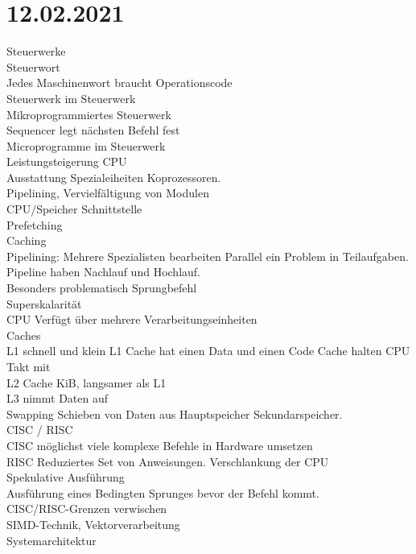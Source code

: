 \documentclass{article}
\begin{document}
	\section*{12.02.2021}
	Steuerwerke \\
	Steuerwort \\
	Jedes Maschinenwort braucht Operationscode \\
	Steuerwerk im Steuerwerk \\
	Mikroprogrammiertes Steuerwerk \\
	Sequencer legt nächsten Befehl fest \\
	Microprogramme im Steuerwerk \\
	Leistungsteigerung CPU \\
	Ausstattung Spezialeiheiten Koprozessoren. \\
	Pipelining, Vervielfältigung von Modulen \\
	CPU/Speicher Schnittstelle \\
	Prefetching \\
	Caching \\
	Pipelining: Mehrere Spezialisten bearbeiten Parallel ein Problem in Teilaufgaben. \\
	Pipeline haben Nachlauf und Hochlauf. \\
	Besonders problematisch Sprungbefehl \\
	Superskalarität \\
	CPU Verfügt über mehrere Verarbeitungseinheiten \\
	Caches \\
	L1 schnell und klein L1 Cache hat einen Data und einen Code Cache halten CPU Takt mit \\
	L2 Cache KiB, langsamer als L1 \\
	L3 nimmt Daten auf\\
	Swapping Schieben von Daten aus Hauptspeicher Sekundarspeicher. \\ 
	CISC / RISC \\
	CISC möglichst viele komplexe Befehle in Hardware umsetzen \\
	RISC Reduziertes Set von Anweisungen. Verschlankung der CPU \\
	Spekulative Ausführung \\
	Ausführung eines Bedingten Sprunges bevor der Befehl kommt. \\
	CISC/RISC-Grenzen verwischen \\
	SIMD-Technik, Vektorverarbeitung \\
	Systemarchitektur \\
\end{document}
